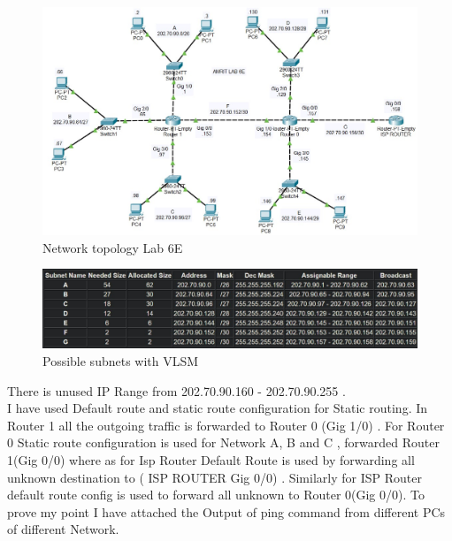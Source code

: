 \documentclass[a4paper,11pt]{article}
\begin{document}
\begin{figure}[H]
    \centering
    \includegraphics[scale=0.75,cframe=blue 0.5pt 3pt]{./FIG/Lab6E.jpg}
    \caption{Network topology Lab 6E}
\end{figure}

\begin{figure}[H]
    \centering
    \includegraphics[scale=0.73,cframe=blue 0.5pt 3pt]{./FIG/EV.jpg}
    \caption{Possible subnets with VLSM}
\end{figure}

There is unused IP Range from 202.70.90.160 - 202.70.90.255 .\\

I have used Default route and static route configuration for Static routing. In Router 1 all the outgoing traffic is forwarded to Router 0 (Gig 1/0) . For Router 0  Static route configuration is used for Network A, B and C , forwarded  Router 1(Gig 0/0) where as for Isp Router Default Route is used by forwarding all unknown destination to ( ISP ROUTER Gig 0/0) . Similarly for ISP Router default route config is used to forward all unknown to Router 0(Gig 0/0). To prove my point I have attached the Output of ping command  from different PCs of different Network.



\pagebreak
\end{document}
